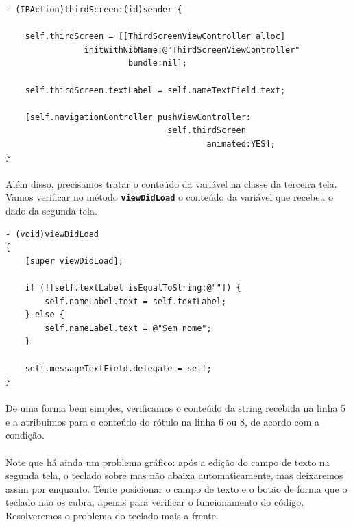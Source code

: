 \documentclass[a4paper,12pt,brazil,doubleside]{book}
\begin{document}
\pagebreak

\begin{listing}
\begin{verbatim}
- (IBAction)thirdScreen:(id)sender {
    
    self.thirdScreen = [[ThirdScreenViewController alloc]
                initWithNibName:@"ThirdScreenViewController"
                         bundle:nil];
    
    self.thirdScreen.textLabel = self.nameTextField.text;
    
    [self.navigationController pushViewController:
                                 self.thirdScreen
                                         animated:YES];
}
\end{verbatim}
\end{listing}

\paragraph{}Além disso, precisamos tratar o conteúdo da variável na classe da terceira tela. Vamos verificar no método \texttt{\textbf{viewDidLoad}} o conteúdo da variável que recebeu o dado da segunda tela.

\begin{listing}
\begin{verbatim}
- (void)viewDidLoad
{
    [super viewDidLoad];
    
    if (![self.textLabel isEqualToString:@""]) {
        self.nameLabel.text = self.textLabel;
    } else {
        self.nameLabel.text = @"Sem nome";
    }
    
    self.messageTextField.delegate = self;
}
\end{verbatim}
\end{listing}

\bigskip

\paragraph{}De uma forma bem simples, verificamos o conteúdo da string recebida na linha 5 e a atribuimos para o conteúdo do rótulo na linha 6 ou 8, de acordo com a condição.
\paragraph{}Note que há ainda um problema gráfico: após a edição do campo de texto na segunda tela, o teclado sobre mas não abaixa automaticamente, mas deixaremos assim por enquanto. Tente posicionar o campo de texto e o botão de forma que o teclado não os cubra, apenas para verificar o funcionamento do código. Resolveremos o problema do teclado mais a frente.
\end{document}
